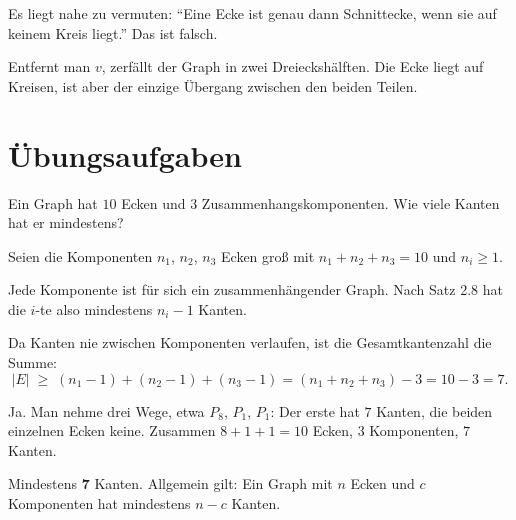 \begin{warnung}
Es liegt nahe zu vermuten: \enquote{Eine Ecke ist genau dann Schnittecke, wenn sie auf keinem Kreis liegt.} Das ist falsch.

\begin{center}
\end{center}

Entfernt man $v$, zerfällt der Graph in zwei Dreieckshälften. Die Ecke liegt auf Kreisen, ist aber der einzige Übergang zwischen den beiden Teilen.

\begin{center}
\begin{minipage}{0.88\textwidth}
\end{minipage}
\end{center}
\end{warnung}

\section{Übungsaufgaben}

\begin{aufgabe}
Ein Graph hat $10$ Ecken und $3$ Zusammenhangskomponenten. Wie viele Kanten hat er mindestens?

\loesung
{}
Seien die Komponenten $n_1$, $n_2$, $n_3$ Ecken groß mit $n_1 + n_2 + n_3 = 10$ und $n_i \ge 1$.

Jede Komponente ist für sich ein zusammenhängender Graph. Nach Satz 2.8 hat die $i$-te also mindestens $n_i - 1$ Kanten.

Da Kanten nie zwischen Komponenten verlaufen, ist die Gesamtkantenzahl die Summe:
\[ |E| \;\ge\; (n_1 - 1) + (n_2 - 1) + (n_3 - 1) = (n_1+n_2+n_3) - 3 = 10 - 3 = 7 . \]

Ja. Man nehme drei Wege, etwa $P_8$, $P_1$, $P_1$: Der erste hat $7$ Kanten, die beiden einzelnen Ecken keine. Zusammen $8+1+1 = 10$ Ecken, $3$ Komponenten, $7$ Kanten.

Mindestens $\mathbf{7}$ Kanten. Allgemein gilt: Ein Graph mit $n$ Ecken und $c$ Komponenten hat mindestens $n - c$ Kanten.
\end{aufgabe}

